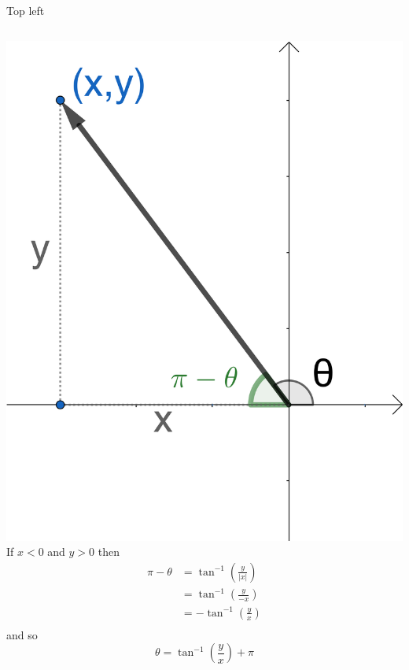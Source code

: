 \documentclass{beamer}
\begin{document}
\begin{frame}{Top left}
\begin{columns}
\includegraphics[scale=0.55]{top-left.png}
If $x<0$ and $y>0$ then
\begin{align*}
\pi-\theta &= \tan^{-1}\left(\frac{y}{|x|}\right)\\
&=\tan^{-1}\left(\frac{y}{-x}\right)\\
&=-\tan^{-1}\left(\frac{y}{x}\right)\\
\end{align*}
and so
\begin{equation*}
\theta = \tan^{-1}\left(\frac{y}{x}\right)+\pi
\end{equation*}
\end{columns}
\end{frame}
\end{document}
